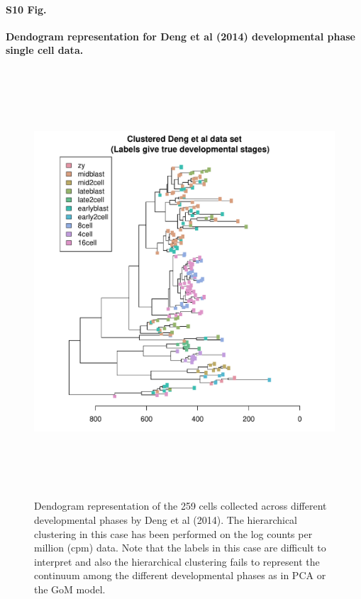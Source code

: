\documentclass[10pt,letterpaper]{article}
\begin{document}
\paragraph*{S10 Fig.}

\label{figS10}
{\bf Dendogram representation for Deng et al (2014) developmental phase single cell data.}
\begin{figure}[ht]
\centering
\includegraphics[height=6.3in, width=6in]{../../plots/dendextend_deng.pdf}
\caption{Dendogram representation of the 259 cells collected across different
developmental phases by Deng et al (2014). The hierarchical clustering in
this case has been performed on the log counts per million (cpm) data.
Note that the labels in this case are difficult to interpret and also the hierarchical
clustering fails to represent the continuum among the different developmental
phases as in PCA or the GoM model.}
\end{figure}
\end{document}
